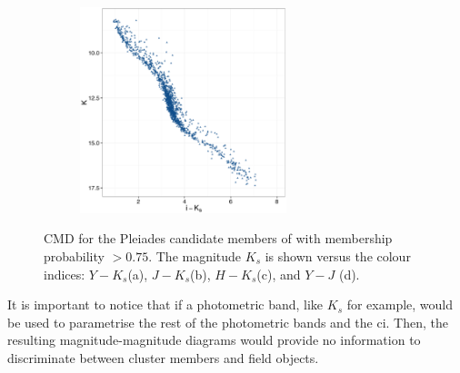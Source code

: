 \begin{figure}[ht!]
\begin{subfigure}[t]{0.45\textwidth}
    \end{subfigure}
     \begin{subfigure}[t]{0.45\textwidth}
      \includegraphics[page=5,height=6cm]{background/Figures/CIs.pdf}
        \caption{}
         
    \end{subfigure}
    \caption{CMD for the Pleiades candidate members of \citet{Bouy2015}  with membership probability $>0.75$. The magnitude $K_s$ is shown versus the colour indices: $Y-K_s$(a), $J-K_s$(b), $H-K_s$(c), and $Y-J$ (d).}
    \label{fig:otherCI}
\end{figure}

It is important to notice that if a photometric band, like $K_s$ for example, would be used to parametrise the rest of the photometric bands and the \gls{ci}. 
Then, the resulting magnitude-magnitude diagrams would provide no information to discriminate between cluster members and field objects. 


%

